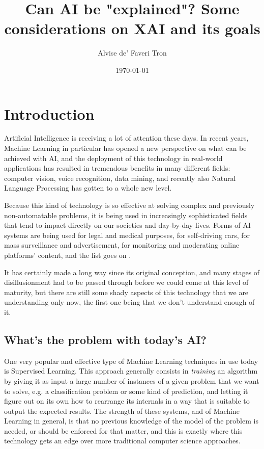 \documentclass{article}
\title{Can AI be "explained"? Some considerations on XAI and its goals}
\author{Alvise de' Faveri Tron}
\date{\today}
\newcommand{\note}{\todo[]}
\begin{document}
\maketitle

\tableofcontents

\section{Introduction}

Artificial Intelligence is receiving a lot of attention these days. \note{cit qualche numero} In recent years, Machine Learning in particular has opened a new perspective on what can be achieved with AI, and the deployment of this technology in real-world applications has resulted in tremendous benefits in many different fields: computer vision, voice recognition, data mining, and recently also Natural Language Processing has gotten to a whole new level. \note{fonte}

Because this kind of technology is so effective at solving complex and previously non-automatable problems, it is being used in increasingly sophisticated fields that tend to impact directly on our societies and day-by-day lives. Forms of AI systems are being used for legal and medical purposes, for self-driving cars, for mass surveillance and advertisement, for monitoring and moderating online platforms' content, and the list goes on \note{molte cit}.

It has certainly made a long way since its original conception, and many stages of disillusionment had to be passed through before we could come at this level of maturity, but there are still some shady aspects of this technology that we are understanding only now, the first one being that we don't understand enough of it.

\subsection{What's the problem with today's AI?}

One very popular and effective type of Machine Learning techniques in use today is Supervised Learning. This approach generally consists in \textit{training} an algorithm by giving it as input a large number of instances of a given problem that we want to solve, e.g. a classification problem or some kind of prediction, and letting it figure out on its own how to rearrange its internals in a way that is suitable to output the expected results. The strength of these systems, and of Machine Learning in general, is that no previous knowledge of the model of the problem is needed, or should be enforced for that matter, and this is exactly where this technology gets an edge over more traditional computer science approaches.
\end{document}
